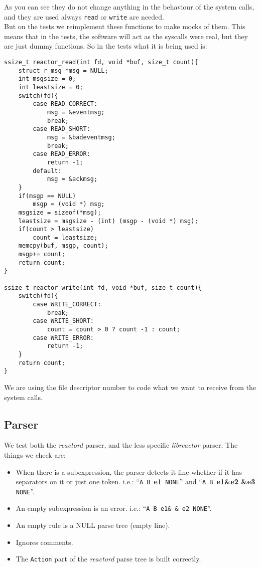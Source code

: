 As you can see they do not change anything in the behaviour of the system calls, and they are used always \texttt{read} or \texttt{write}
are needed.\\
But on the tests we reimplement these functions to make mocks of them. This means that in the tests, the software will act as the syscalls
were real, but they are just dummy functions. So in the tests what it is being used is:
\begin{verbatim}
ssize_t reactor_read(int fd, void *buf, size_t count){
    struct r_msg *msg = NULL;
    int msgsize = 0;
    int leastsize = 0;
    switch(fd){
        case READ_CORRECT:
            msg = &eventmsg;
            break;
        case READ_SHORT:
            msg = &badeventmsg;
            break;
        case READ_ERROR:
            return -1;
        default:
            msg = &ackmsg;
    }
    if(msgp == NULL) 
        msgp = (void *) msg;
    msgsize = sizeof(*msg);
    leastsize = msgsize - (int) (msgp - (void *) msg);
    if(count > leastsize) 
        count = leastsize;
    memcpy(buf, msgp, count);
    msgp+= count;
    return count;
}

ssize_t reactor_write(int fd, void *buf, size_t count){
    switch(fd){
        case WRITE_CORRECT:
            break;
        case WRITE_SHORT:
            count = count > 0 ? count -1 : count;
        case WRITE_ERROR:
            return -1;
    }
    return count;
}
\end{verbatim}
We are using the file descriptor number to code what we want to receive from the system calls.
\subsection{Parser}
We test both the \emph{reactord} parser, and the less specific \emph{libreactor} parser. The things we check are:
\begin{itemize}
  \item When there is a subexpression, the parser detects it fine whether if it has separators on it or just one token. i.e.:
    ``\texttt{A B }{\bf e1}\texttt{ NONE}'' and ``\texttt{A B }{\bf e1\&e2 \&e3}\texttt{ NONE}''.
  \item An empty subexpression is an error. i.e.: ``\texttt{A B e1\& \& e2 NONE}''.
  \item An empty rule is a NULL parse tree (empty line).
  \item Ignores comments.
  \item The \texttt{Action} part of the \emph{reactord} parse tree is built correctly.
\end{itemize}
